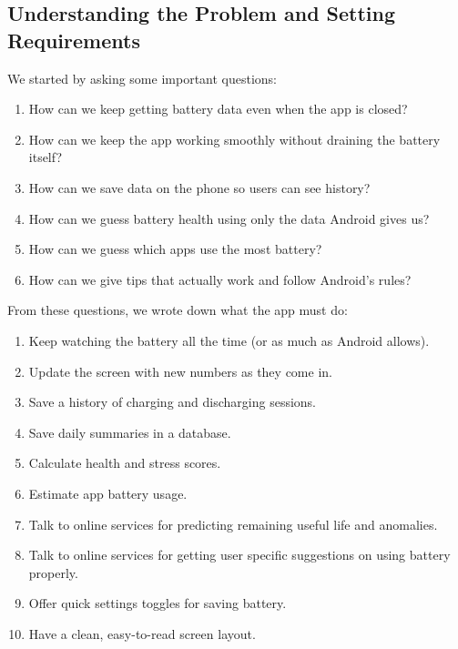 \documentclass[12pt,a4paper]{report}
\begin{document}
\subsection{Understanding the Problem and Setting Requirements}
We started by asking some important questions:

\begin{enumerate}
    \item How can we keep getting battery data even when the app is closed?
    \item How can we keep the app working smoothly without draining the battery itself?
    \item How can we save data on the phone so users can see history?
    \item How can we guess battery health using only the data Android gives us?
    \item How can we guess which apps use the most battery?
    \item How can we give tips that actually work and follow Android's rules?
\end{enumerate}

\noindent From these questions, we wrote down what the app must do:

\begin{enumerate}
    \item Keep watching the battery all the time (or as much as Android allows).
    \item Update the screen with new numbers as they come in.
    \item Save a history of charging and discharging sessions.
    \item Save daily summaries in a database.
    \item Calculate health and stress scores.
    \item Estimate app battery usage.
    \item Talk to online services for predicting remaining useful life and anomalies.
    \item Talk to online services for getting user specific suggestions on using battery properly.
    \item Offer quick settings toggles for saving battery.
    \item Have a clean, easy-to-read screen layout.
\end{enumerate}
\end{document}
